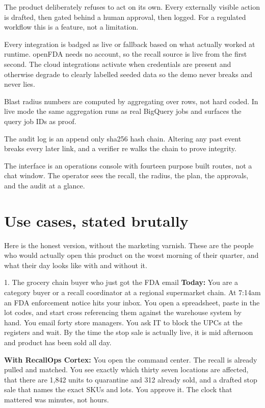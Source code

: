 \documentclass[11pt]{article}
\begin{document}
\begin{description}[leftmargin=0pt,style=nextline]
\item[Provenance beats autonomy.] The product deliberately refuses to act on its own. Every
externally visible action is drafted, then gated behind a human approval, then logged. For a
regulated workflow this is a feature, not a limitation.
\item[Honest fallback, never a fake green light.] Every integration is badged as live or fallback
based on what actually worked at runtime. openFDA needs no account, so the recall source is live
from the first second. The cloud integrations activate when credentials are present and otherwise
degrade to clearly labelled seeded data so the demo never breaks and never lies.
\item[Real evidence or it does not ship.] Blast radius numbers are computed by aggregating over
rows, not hard coded. In live mode the same aggregation runs as real BigQuery jobs and surfaces
the query job IDs as proof.
\item[Tamper evidence by construction.] The audit log is an append only sha256 hash chain. Altering
any past event breaks every later link, and a verifier re walks the chain to prove integrity.
\item[Command center, not conversation.] The interface is an operations console with fourteen
purpose built routes, not a chat window. The operator sees the recall, the radius, the plan, the
approvals, and the audit at a glance.
\end{description}

\section{Use cases, stated brutally}

Here is the honest version, without the marketing varnish. These are the people who would actually
open this product on the worst morning of their quarter, and what their day looks like with and
without it.

\begin{usecase}{1. The grocery chain buyer who just got the FDA email}
\textbf{Today:} You are a category buyer or a recall coordinator at a regional supermarket chain.
At 7:14am an FDA enforcement notice hits your inbox. You open a spreadsheet, paste in the lot
codes, and start cross referencing them against the warehouse system by hand. You email forty store
managers. You ask IT to block the UPCs at the registers and wait. By the time the stop sale is
actually live, it is mid afternoon and product has been sold all day.

\textbf{With RecallOps Cortex:} You open the command center. The recall is already pulled and
matched. You see exactly which thirty seven locations are affected, that there are 1,842 units to
quarantine and 312 already sold, and a drafted stop sale that names the exact SKUs and lots. You
approve it. The clock that mattered was minutes, not hours.
\end{usecase}
\end{document}
